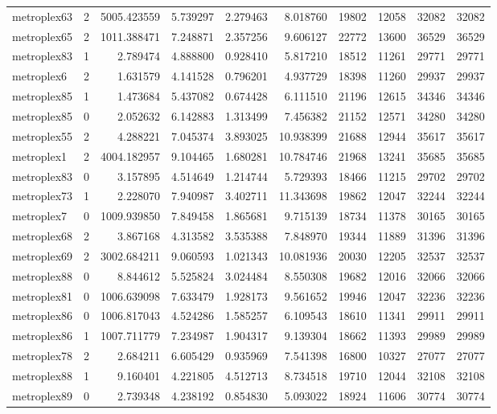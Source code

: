 \begin{longtable}{|l|r|r|r|r|r|r|r|r|r|}
metroplex63 & 2 & 5005.423559 & 5.739297 & 2.279463 & 8.018760 & 19802 & 12058 & 32082 & 32082 \\
metroplex65 & 2 & 1011.388471 & 7.248871 & 2.357256 & 9.606127 & 22772 & 13600 & 36529 & 36529 \\
metroplex83 & 1 & 2.789474 & 4.888800 & 0.928410 & 5.817210 & 18512 & 11261 & 29771 & 29771 \\
metroplex6 & 2 & 1.631579 & 4.141528 & 0.796201 & 4.937729 & 18398 & 11260 & 29937 & 29937 \\
metroplex85 & 1 & 1.473684 & 5.437082 & 0.674428 & 6.111510 & 21196 & 12615 & 34346 & 34346 \\
metroplex85 & 0 & 2.052632 & 6.142883 & 1.313499 & 7.456382 & 21152 & 12571 & 34280 & 34280 \\
metroplex55 & 2 & 4.288221 & 7.045374 & 3.893025 & 10.938399 & 21688 & 12944 & 35617 & 35617 \\
metroplex1 & 2 & 4004.182957 & 9.104465 & 1.680281 & 10.784746 & 21968 & 13241 & 35685 & 35685 \\
metroplex83 & 0 & 3.157895 & 4.514649 & 1.214744 & 5.729393 & 18466 & 11215 & 29702 & 29702 \\
metroplex73 & 1 & 2.228070 & 7.940987 & 3.402711 & 11.343698 & 19862 & 12047 & 32244 & 32244 \\
metroplex7 & 0 & 1009.939850 & 7.849458 & 1.865681 & 9.715139 & 18734 & 11378 & 30165 & 30165 \\
metroplex68 & 2 & 3.867168 & 4.313582 & 3.535388 & 7.848970 & 19344 & 11889 & 31396 & 31396 \\
metroplex69 & 2 & 3002.684211 & 9.060593 & 1.021343 & 10.081936 & 20030 & 12205 & 32537 & 32537 \\
metroplex88 & 0 & 8.844612 & 5.525824 & 3.024484 & 8.550308 & 19682 & 12016 & 32066 & 32066 \\
metroplex81 & 0 & 1006.639098 & 7.633479 & 1.928173 & 9.561652 & 19946 & 12047 & 32236 & 32236 \\
metroplex86 & 0 & 1006.817043 & 4.524286 & 1.585257 & 6.109543 & 18610 & 11341 & 29911 & 29911 \\
metroplex86 & 1 & 1007.711779 & 7.234987 & 1.904317 & 9.139304 & 18662 & 11393 & 29989 & 29989 \\
metroplex78 & 2 & 2.684211 & 6.605429 & 0.935969 & 7.541398 & 16800 & 10327 & 27077 & 27077 \\
metroplex88 & 1 & 9.160401 & 4.221805 & 4.512713 & 8.734518 & 19710 & 12044 & 32108 & 32108 \\
metroplex89 & 0 & 2.739348 & 4.238192 & 0.854830 & 5.093022 & 18924 & 11606 & 30774 & 30774 \\

\end{longtable}
